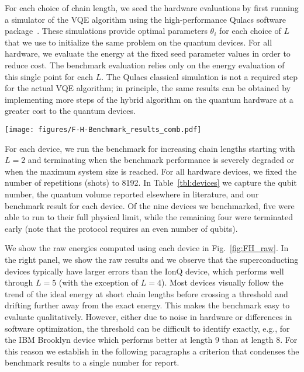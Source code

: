\documentclass[
prx,
superscriptaddress,
twocolumn,
longbibliography
]{revtex4-1}
\begin{document}
For each choice of chain length, we seed the hardware evaluations by first running a simulator of the VQE algorithm using the high-performance Qulacs software package~\cite{qulacs}. These simulations provide optimal parameters $\theta_i$ for each choice of $L$ that we use to initialize the same problem on the quantum devices. For all hardware, we  evaluate the energy at the fixed seed parameter values in order to reduce cost. The benchmark evaluation relies only on the energy evaluation of this single point for each $L$. The Qulacs classical simulation is not a required step for the actual VQE algorithm; in principle, the same results can be obtained by implementing more steps of the hybrid algorithm on the quantum hardware at a greater cost to the quantum devices. 


\begin{figure*}[htb!]
\texttt{[image: figures/F-H-Benchmark\_results\_comb.pdf]}
\caption{(Left) Raw data of the single particle energy as a function of Fermi-Hubbard chain length ($N=2L$). In all cases, error bars are smaller than marker size. (Right) Mitigated data of the single particle energy after SPAM error mitigation. Data points are horizontally offset slightly from their integer values to reduce clutter.}
\label{fig:FH_raw}
\end{figure*}

For each device, we run the benchmark for increasing chain lengths starting with $L=2$ and terminating when the benchmark performance is severely degraded or when the maximum system size is reached. For all hardware devices, we fixed the number of repetitions (shots) to 8192. In Table~\ref{tbl:devices} we capture the qubit number, the quantum volume reported elsewhere in literature, and our benchmark result for each device. Of the nine devices we benchmarked, five were able to run to their full physical limit, while the remaining four were terminated early (note that the protocol requires an even number of qubits).

We show the raw energies computed using each device in Fig.~\ref{fig:FH_raw}. In the right panel, we show the raw results and we observe that the superconducting devices typically have larger errors than the IonQ device, which performs well through $L=5$ (with the exception of $L=4$). Most devices visually follow the trend of the ideal energy at short chain lengths before crossing a threshold and drifting further away from the exact energy. This makes the benchmark easy to evaluate qualitatively. However, either due to noise in hardware or differences in software optimization, the threshold can be difficult to identify exactly, e.g., for the IBM Brooklyn device which performs better at length 9 than at length 8. For this reason we establish in the following paragraphs a criterion that condenses the benchmark results to a single number for report.
\end{document}
